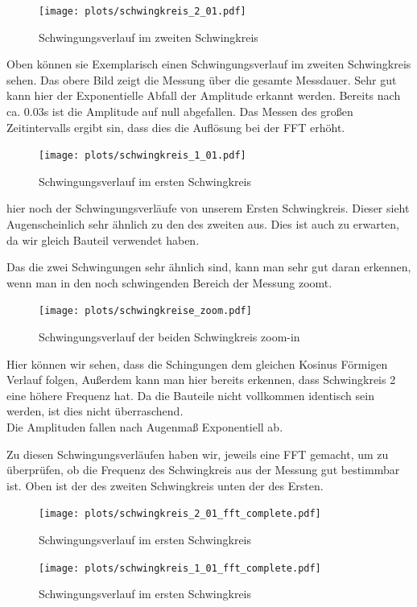 \documentclass[twoside]{protokoll}
\begin{document}
\begin{figure}[H]
    \centering
    \texttt{[image: plots/schwingkreis\_2\_01.pdf]}
    \caption{Schwingungsverlauf im zweiten Schwingkreis}
\end{figure}

Oben können sie Exemplarisch einen Schwingungsverlauf im zweiten Schwingkreis sehen. 
Das obere Bild zeigt die Messung über die gesamte Messdauer. 
Sehr gut kann hier der Exponentielle Abfall der Amplitude erkannt werden. Bereits nach ca. 0.03s ist die Amplitude auf null abgefallen. 
Das Messen des großen Zeitintervalls ergibt sin, dass dies die Auflösung bei der FFT erhöht.
\begin{figure}[H]
    \centering
    \texttt{[image: plots/schwingkreis\_1\_01.pdf]}
    \caption{Schwingungsverlauf im ersten Schwingkreis}
\end{figure}
hier noch der Schwingungsverläufe von unserem Ersten Schwingkreis. Dieser sieht Augenscheinlich sehr ähnlich zu den des zweiten aus.
Dies ist auch zu erwarten, da wir gleich Bauteil verwendet haben.

Das die zwei Schwingungen sehr ähnlich sind, kann man sehr gut daran erkennen, wenn man in den noch schwingenden Bereich der Messung zoomt.
\begin{figure}[H]
    \centering
    \texttt{[image: plots/schwingkreise\_zoom.pdf]}
    \caption{Schwingungsverlauf der beiden Schwingkreis zoom-in}
\end{figure}
Hier können wir sehen, dass die Schingungen dem gleichen Kosinus Förmigen Verlauf folgen, Außerdem kann man hier bereits erkennen, dass Schwingkreis 2 eine höhere Frequenz hat.
Da die Bauteile nicht vollkommen identisch sein werden, ist dies nicht überraschend.\\
Die Amplituden fallen nach Augenmaß Exponentiell ab.

Zu diesen Schwingungsverläufen haben wir, jeweils eine FFT gemacht, um zu überprüfen, ob die Frequenz des Schwingkreis aus der Messung gut bestimmbar ist.
Oben ist der des zweiten Schwingkreis unten der des Ersten.


\begin{figure}[H]
    \centering
    \texttt{[image: plots/schwingkreis\_2\_01\_fft\_complete.pdf]}
    \caption{Schwingungsverlauf im ersten Schwingkreis}
\end{figure}

\begin{figure}[H]
    \centering
    \texttt{[image: plots/schwingkreis\_1\_01\_fft\_complete.pdf]}
    \caption{Schwingungsverlauf im ersten Schwingkreis}
\end{figure}
\end{document}

